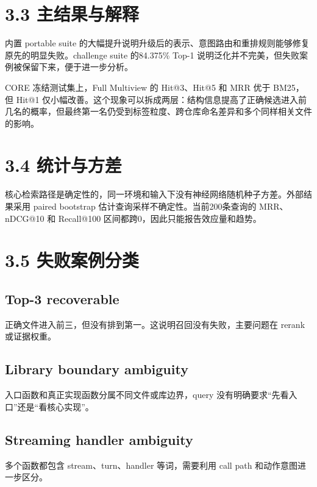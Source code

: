 \documentclass[UTF8,12pt,openany]{ctexbook}
\begin{document}
\section{3.3 主结果与解释}

内置 portable suite 的大幅提升说明升级后的表示、意图路由和重排规则能够修复原先的明显失败。challenge suite 的84.375\% Top-1 说明泛化并不完美，但失败案例被保留下来，便于进一步分析。\par

CORE 冻结测试集上，Full Multiview 的 Hit@3、Hit@5 和 MRR 优于 BM25，但 Hit@1 仅小幅改善。这个现象可以拆成两层：结构信息提高了正确候选进入前几名的概率，但最终第一名仍受到标签粒度、跨仓库命名差异和多个同样相关文件的影响。\par

\section{3.4 统计与方差}

核心检索路径是确定性的，同一环境和输入下没有神经网络随机种子方差。外部结果采用 paired bootstrap 估计查询采样不确定性。当前200条查询的 MRR、nDCG@10 和 Recall@100 区间都跨0，因此只能报告效应量和趋势。\par

\section{3.5 失败案例分类}

\subsection{Top-3 recoverable}

正确文件进入前三，但没有排到第一。这说明召回没有失败，主要问题在 rerank 或证据权重。\par

\subsection{Library boundary ambiguity}

入口函数和真正实现函数分属不同文件或库边界，query 没有明确要求“先看入口”还是“看核心实现”。\par

\subsection{Streaming handler ambiguity}

多个函数都包含 stream、turn、handler 等词，需要利用 call path 和动作意图进一步区分。\par
\end{document}
